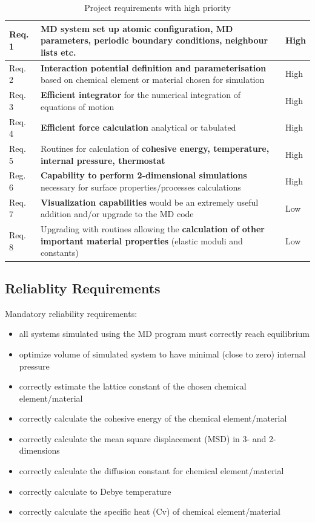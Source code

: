 \documentclass[12pt,a4paper]{article}
\begin{document}
\begin{table}[h]
\caption{Project requirements with high priority}
\begin{tabular}{| p{} | p{} | p{} |}
	\hline
	Req. 1 & \textbf{MD system set up} atomic configuration, MD parameters, periodic boundary conditions,  neighbour lists etc. & High \\
	\hline
	Req. 2 & \textbf{Interaction potential definition and parameterisation} based on chemical element or material chosen for simulation & High \\
	\hline
	Req. 3 & \textbf{Efficient integrator} for the numerical integration of equations of motion & High \\
	\hline
	Req. 4 & \textbf{Efficient force calculation} analytical or tabulated & High \\
	\hline
	Req. 5 & Routines for calculation of  \textbf{cohesive energy, temperature, internal pressure, thermostat} & High \\
	\hline
	Reg. 6 & \textbf{Capability to perform 2-dimensional simulations} necessary for surface properties/processes calculations & High \\
	\hline 
	Req. 7 & \textbf{Visualization capabilities} would be an extremely useful addition and/or upgrade to the MD code & Low \\
	\hline
	Req. 8 & Upgrading with routines allowing the \textbf{calculation of other important material properties} (elastic moduli and constants) & Low \\
	\hline
\end{tabular}
\label{tab:Requirements}
\end{table}

\subsection{Reliablity Requirements}
Mandatory reliability requirements:
\begin{itemize}
\item all systems simulated using the MD program must correctly reach equilibrium
\item optimize volume of simulated system to have minimal (close to zero) internal pressure
\item correctly estimate the lattice constant of the chosen chemical element/material
\item correctly calculate the cohesive energy of the chemical element/material
\item correctly calculate the mean square displacement (MSD) in 3- and 2-dimensions
\item correctly calculate the diffusion constant for chemical element/material
\item correctly calculate to Debye temperature
\item correctly calculate the specific heat (Cv) of chemical element/material
\end{itemize}
\end{document}
